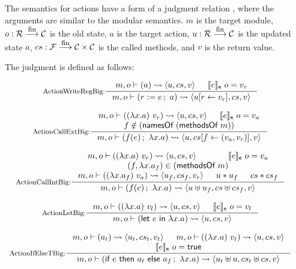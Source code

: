 The semantics for actions have a form of a judgment relation
, where the arguments are similar to the
modular semantics. $m$ is the target module, $o : \mathcal{R} \stackrel{\textrm{\footnotesize{fin}}}{\longrightarrow} \mathcal{C}{}$ is the
old state, $a$ is the target action, $u : \mathcal{R} \stackrel{\textrm{\footnotesize{fin}}}{\longrightarrow} \mathcal{C}{}$ is the updated
state $a$, $cs : \mathcal{F} \stackrel{\textrm{\footnotesize{fin}}}{\longrightarrow} \mathcal{C} \times \mathcal{C}{}$ is the called methods, and $v$ is the
return value.

\begin{definition}
  \label{def-sembigact}
  The judgment  is defined as follows:
  \begin{center}
    \begin{math}
      \begin{array}{c}
        \inference[ActionWriteRegBig:]{\sembigact{m}{o}{a}{u}{cs}{v} & \semexpr{e}{o} = v_r}
                  {\sembigact{m}{o}{\actwrite{r}{e}{a}}{\stupd{u}{r}{v_r}}{cs}{v}} \\
        \mbox{} \\
        \inference[ActionCallExtBig:]{\sembigact{m}{o}{(\lambda x.a)\ v_r}{u}{cs}{v}
          & \semexpr{e}{o} = v_a \\
          f \notin (\namesof{(\methsofm{m})})
        }
                  {\sembigact{m}{o}{\actcall{x}{f}{e}{a}}{u}{\lblupd{cs}{f}{(v_a, v_r)}}{v}} \\
        \mbox{} \\
        \inference[ActionCallIntBig:]{\sembigact{m}{o}{(\lambda x.a)\ v_r}{u}{cs}{v}
          & \semexpr{e}{o} = v_a \\
          (f, \lambda x.a_f) \in (\methsofm{m}) \\
          \sembigact{m}{o}{(\lambda x.a_f)\ v_a}{u_f}{cs_f}{v_r}
          & \sdisj{u}{u_f}
          & \ldisj{cs}{cs_f}
        }
                  {\sembigact{m}{o}{\actcall{x}{f}{e}{a}}{\splus{u}{u_f}}{\lplus{cs}{cs_f}}{v}} \\
        \mbox{} \\
        \inference[ActionLetBig:]{\sembigact{m}{o}{(\lambda x.a)\ v_l}{u}{cs}{v} & \semexpr{e}{o} = v_l}
                  {\sembigact{m}{o}{\actlet{e}{x}{a}}{u}{cs}{v}} \\
        \mbox{} \\
        \inference[ActionIfElseTBig:]{\sembigact{m}{o}{a_t}{u_t}{cs_t}{v_t} &
          \sembigact{m}{o}{(\lambda x.a)\ v_t}{u}{cs}{v} \\
          \semexpr{e}{o} = \btrue{}}
                  {\sembigact{m}{o}{\actifelse{e}{a_t}{a_f}{x}{a}}{\splus{u_t}{u}}{\splus{cs_t}{cs}}{v}} \\

\end{array}
\end{math}
\end{center}
\end{definition}
